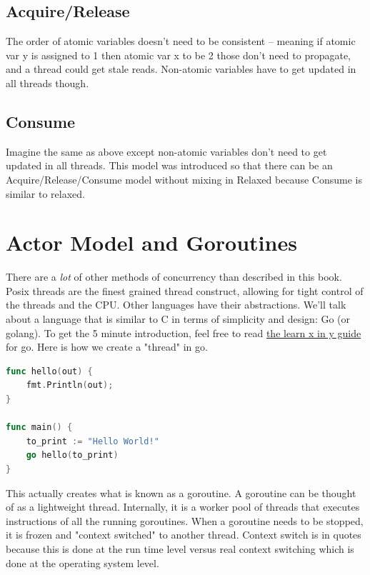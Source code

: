 \subsection{Acquire/Release}

The order of atomic variables doesn't need to be consistent -- meaning if atomic var y is assigned to 1 then atomic var x to be 2 those don't need to propagate, and a thread could get stale reads.
Non-atomic variables have to get updated in all threads though.

\subsection{Consume}

Imagine the same as above except non-atomic variables don't need to get updated in all threads.
This model was introduced so that there can be an Acquire/Release/Consume model without mixing in Relaxed because Consume is similar to relaxed.

\section{Actor Model and Goroutines}

There are a \textit{lot} of other methods of concurrency than described in this book.
Posix threads are the finest grained thread construct, allowing for tight control of the threads and the CPU.
Other languages have their abstractions.
We'll talk about a language that is similar to C in terms of simplicity and design: Go (or golang).
To get the 5 minute introduction, feel free to read \href{https://learnxinyminutes.com/docs/go/}{the learn x in y guide} for go.
Here is how we create a "thread" in go.

\begin{lstlisting}[language=Go]
func hello(out) {
    fmt.Println(out);
}

func main() {
    to_print := "Hello World!"
    go hello(to_print)
}
\end{lstlisting}

This actually creates what is known as a goroutine.
A goroutine can be thought of as a lightweight thread.
Internally, it is a worker pool of threads that executes instructions of all the running goroutines.
When a goroutine needs to be stopped, it is frozen and "context switched" to another thread.
Context switch is in quotes because this is done at the run time level versus real context switching which is done at the operating system level.

